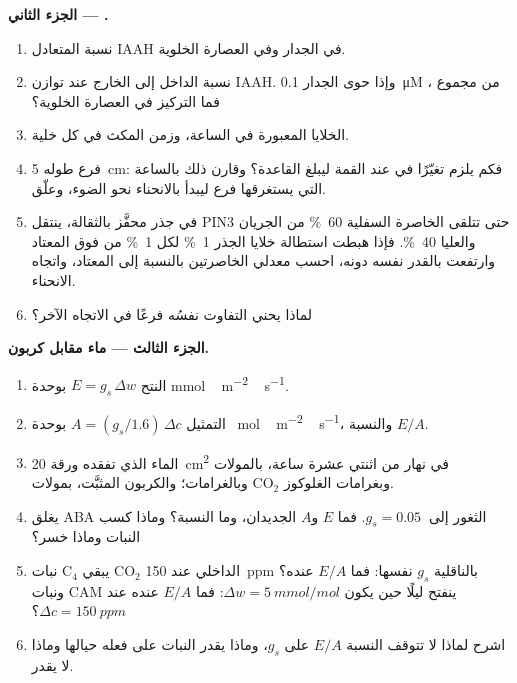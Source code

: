 \begin{problem}
\medskip
\noindent\textbf{الجزء الثاني --- .}
\begin{enumerate}[resume]
  \item نسبة  المتعادل IAAH في الجدار وفي العصارة
        الخلوية.
  \item نسبة الداخل إلى الخارج عند توازن IAAH. وإذا حوى
        الجدار \qty{0.1}{\micro M} من مجموع ، فما
        التركيز في العصارة الخلوية؟
  \item الخلايا المعبورة في الساعة، وزمن المكث في كل خلية.
  \item فرع طوله \qty{5}{cm}: فكم يلزم تغيّرًا في  عند
        القمة ليبلغ القاعدة؟ وقارن ذلك بالساعة التي يستغرقها
        فرع ليبدأ بالانحناء نحو الضوء، وعلّق.
  \item في جذر محفَّز بالثقالة، ينتقل PIN3 حتى تتلقى الخاصرة
        السفلية \qty{60}{\%} من الجريان والعليا \qty{40}{\%}.
        فإذا هبطت استطالة خلايا الجذر \qty{1}{\%} لكل
        \qty{1}{\%} من  فوق المعتاد وارتفعت بالقدر
        نفسه دونه، احسب معدلي الخاصرتين بالنسبة إلى المعتاد،
        واتجاه الانحناء.
  \item لماذا يحني التفاوت نفسُه فرعًا في الاتجاه الآخر؟
\end{enumerate}

\medskip
\noindent\textbf{الجزء الثالث --- ماء مقابل كربون.}
\begin{enumerate}[resume]
  \item النتح $E = g_{s}\,\Delta w$ بوحدة \unit{mmol\,m^{-2}\,s^{-1}}.
  \item التمثيل $A = (g_{s}/1.6)\,\Delta c$ بوحدة \unit{\micro
        mol\,m^{-2}\,s^{-1}}، والنسبة $E/A$.
  \item الماء الذي تفقده ورقة \qty{20}{cm^2} في نهار من اثنتي
        عشرة ساعة، بالمولات وبالغرامات؛ والكربون المثبَّت،
        بمولات CO$_{2}$ وبغرامات الغلوكوز.
  \item يغلق ABA الثغور إلى $g_{s} = \qty{0.05}{}$. فما $E$
        و$A$ الجديدان، وما النسبة؟ وماذا كسب النبات وماذا خسر؟
  \item نبات C$_{4}$ يبقي CO$_{2}$ الداخلي عند \qty{150}{ppm}
        بالناقلية $g_{s}$ نفسها: فما $E/A$ عنده؟ ونبات CAM
        ينفتح ليلًا حين يكون $\Delta w = \qty{5}{mmol/mol}$: فما
        $E/A$ عنده عند $\Delta c =
        \qty{150}{ppm}$؟
  \item اشرح لماذا لا تتوقف النسبة $E/A$ على $g_{s}$، وماذا
        يقدر النبات على فعله حيالها وماذا لا يقدر.
\end{enumerate}


\end{problem}
